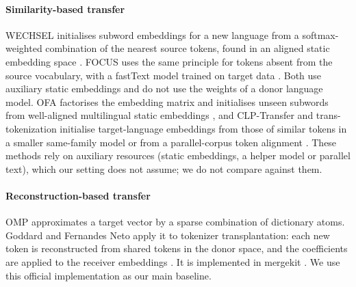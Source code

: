 \documentclass[preprint,12pt]{elsarticle}
\begin{document}
\paragraph{Similarity-based transfer} WECHSEL initialises subword embeddings for a new language from a softmax-weighted combination of the nearest source tokens, found in an aligned static embedding space \cite{minixhofer2022wechsel}. FOCUS uses the same principle for tokens absent from the source vocabulary, with a fastText model trained on target data \cite{dobler2023focus,bojanowski2017fasttext}. Both use auxiliary static embeddings and do not use the weights of a donor language model. OFA factorises the embedding matrix and initialises unseen subwords from well-aligned multilingual static embeddings \cite{liu2024ofa}, and CLP-Transfer and trans-tokenization initialise target-language embeddings from those of similar tokens in a smaller same-family model or from a parallel-corpus token alignment \cite{ostendorff2023clptransfer,remy2024transtokenization}. These methods rely on auxiliary resources (static embeddings, a helper model or parallel text), which our setting does not assume; we do not compare against them.

\paragraph{Reconstruction-based transfer} OMP \cite{pati1993omp,tropp2007signal} approximates a target vector by a sparse combination of dictionary atoms. Goddard and Fernandes Neto apply it to tokenizer transplantation: each new token is reconstructed from shared tokens in the donor space, and the coefficients are applied to the receiver embeddings \cite{goddard2025omp}. It is implemented in mergekit \cite{goddard2024mergekit}. We use this official implementation as our main baseline.
\end{document}
